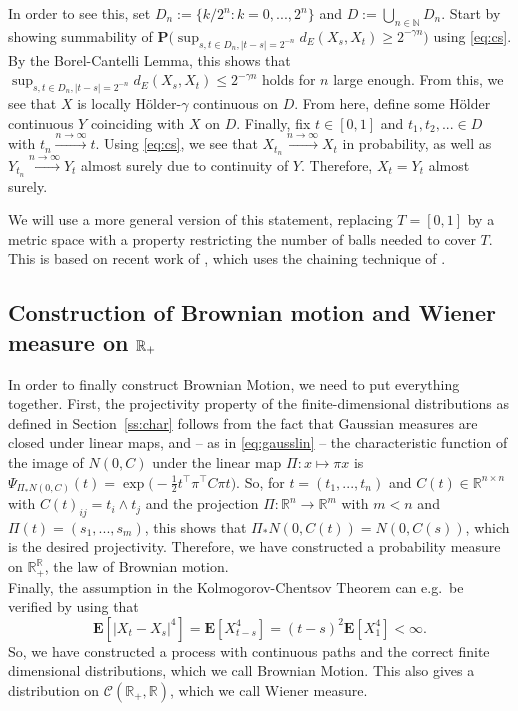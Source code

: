 \documentclass[lean]{Draft}
\begin{document}
In order to see this, set $D_n := \{k/2^n: k=0,...,2^n\}$ and $D := \bigcup_{n\in\mathbb N} D_n$. Start by showing summability of $\mathbf P\Big( \sup_{s,t\in D_n, |t-s| = 2^{-n}} d_E(X_s, X_t) \geq 2^{-\gamma n} \Big)$ using \eqref{eq:cs}.
By the Borel-Cantelli Lemma, this shows that $\sup_{s,t\in D_n, |t-s| = 2^{-n}} d_E(X_s, X_t) \leq 2^{-\gamma n}$ holds for $n$ large enough.
From this, we see that $X$ is locally Hölder-$\gamma$ continuous on $D$.
From here, define some Hölder continuous $Y$ coinciding with $X$ on $D$.
Finally, fix $t \in [0,1]$ and $t_1, t_2,...\in D$ with $t_n \xrightarrow{n\to\infty} t$.
Using \eqref{eq:cs}, we see that $X_{t_n} \xrightarrow{n\to\infty} X_t$ in probability, as well as $Y_{t_n} \xrightarrow{n\to\infty} Y_t$ almost surely due to continuity of $Y$.
Therefore, $X_t = Y_t$ almost surely.

We will use a more general version of this statement, replacing $T = [0,1]$ by a metric space with a property restricting the number of balls needed to cover $T$. This is based on recent work of \cite{kratschmer2023kolmogorov}, which uses the chaining technique of \cite{talagrand2022upper}.



\subsection{Construction of Brownian motion and Wiener measure on $\mathbb{R}_+$}

In order to finally construct Brownian Motion, we need to put everything together. First, the projectivity property of the finite-dimensional distributions as defined in Section~\ref{ss:char} follows from the fact that Gaussian measures are closed under linear maps, and -- as in \eqref{eq:gausslin} -- the characteristic function of the image of $N(0,C)$ under the linear map $\Pi : x \mapsto \pi x$ is $\Psi_{\Pi_\ast N(0,C)}(t) = \exp\Big( -\tfrac 12 t^\top \pi^\top C \pi t \Big)$. So, for $t = (t_1,...,t_n)$ and $C(t) \in \mathbb R^{n\times n}$ with $C(t)_{ij} = t_i \wedge t_j$ and the projection $\Pi: \mathbb R^n \to \mathbb R^m$ with $m < n$ and $\Pi(t) = (s_1,...,s_m)$, this shows that $\Pi_\ast N(0,C(t)) = N(0,C(s))$, which is the desired projectivity. Therefore, we have constructed a probability measure on $\mathbb R_+^{\mathbb R}$, the law of Brownian motion.\\
Finally, the assumption in the Kolmogorov-Chentsov Theorem can e.g.\ be verified by using that
\[ \mathbf E[|X_t - X_s|^4] = \mathbf E[X_{t-s}^4] = (t-s)^2 \mathbf E[X_{1}^4] < \infty.\]
So, we have constructed a process with continuous paths and the correct finite dimensional distributions, which we call Brownian Motion.
This also gives a distribution on $\mathcal C(\mathbb R_+, \mathbb R)$, which we call Wiener measure.
\end{document}
